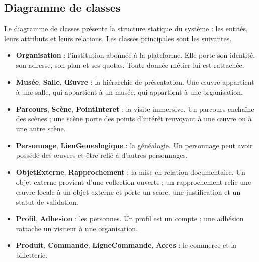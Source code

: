 \subsection{Diagramme de classes}

Le diagramme de classes présente la structure statique du système : les entités,
leurs attributs et leurs relations. Les classes principales sont les suivantes.

\begin{itemize}
  \item \textbf{Organisation} : l'institution abonnée à la plateforme. Elle
        porte son identité, son adresse, son plan et ses quotas. Toute donnée
        métier lui est rattachée.
  \item \textbf{Musée}, \textbf{Salle}, \textbf{Œuvre} : la hiérarchie de
        présentation. Une œuvre appartient à une salle, qui appartient à un
        musée, qui appartient à une organisation.
  \item \textbf{Parcours}, \textbf{Scène}, \textbf{PointInteret} : la visite
        immersive. Un parcours enchaîne des scènes ; une scène porte des points
        d'intérêt renvoyant à une œuvre ou à une autre scène.
  \item \textbf{Personnage}, \textbf{LienGenealogique} : la généalogie. Un
        personnage peut avoir possédé des œuvres et être relié à d'autres
        personnages.
  \item \textbf{ObjetExterne}, \textbf{Rapprochement} : la mise en relation
        documentaire. Un objet externe provient d'une collection ouverte ; un
        rapprochement relie une œuvre locale à un objet externe et porte un
        score, une justification et un statut de validation.
  \item \textbf{Profil}, \textbf{Adhesion} : les personnes. Un profil est un
        compte ; une adhésion rattache un visiteur à une organisation.
  \item \textbf{Produit}, \textbf{Commande}, \textbf{LigneCommande},
        \textbf{Acces} : le commerce et la billetterie.
\end{itemize}

